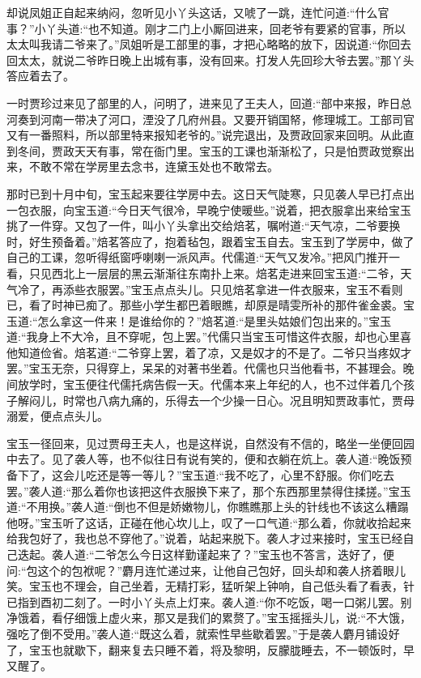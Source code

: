 

\begin{parag}
    却说凤姐正自起来纳闷，忽听见小丫头这话，又唬了一跳，连忙问道:“什么官事？”小丫头道:“也不知道。刚才二门上小厮回进来，回老爷有要紧的官事，所以太太叫我请二爷来了。”凤姐听是工部里的事，才把心略略的放下，因说道:“你回去回太太，就说二爷昨日晚上出城有事，没有回来。打发人先回珍大爷去罢。”那丫头答应着去了。
\end{parag}


\begin{parag}
    一时贾珍过来见了部里的人，问明了，进来见了王夫人，回道:“部中来报，昨日总河奏到河南一带决了河口，湮没了几府州县。又要开销国帑，修理城工。工部司官又有一番照料，所以部里特来报知老爷的。”说完退出，及贾政回家来回明。从此直到冬间，贾政天天有事，常在衙门里。宝玉的工课也渐渐松了，只是怕贾政觉察出来，不敢不常在学房里去念书，连黛玉处也不敢常去。
\end{parag}


\begin{parag}
    那时已到十月中旬，宝玉起来要往学房中去。这日天气陡寒，只见袭人早已打点出一包衣服，向宝玉道:“今日天气很冷，早晚宁使暖些。”说着，把衣服拿出来给宝玉挑了一件穿。又包了一件，叫小丫头拿出交给焙茗，嘱咐道:“天气凉，二爷要换时，好生预备着。”焙茗答应了，抱着毡包，跟着宝玉自去。宝玉到了学房中，做了自己的工课，忽听得纸窗呼喇喇一派风声。代儒道:“天气又发冷。”把风门推开一看，只见西北上一层层的黑云渐渐往东南扑上来。焙茗走进来回宝玉道:“二爷，天气冷了，再添些衣服罢。”宝玉点点头儿。只见焙茗拿进一件衣服来，宝玉不看则已，看了时神已痴了。那些小学生都巴着眼瞧，却原是晴雯所补的那件雀金裘。宝玉道:“怎么拿这一件来！是谁给你的？”焙茗道:“是里头姑娘们包出来的。”宝玉道:“我身上不大冷，且不穿呢，包上罢。”代儒只当宝玉可惜这件衣服，却也心里喜他知道俭省。焙茗道:“二爷穿上罢，着了凉，又是奴才的不是了。二爷只当疼奴才罢。”宝玉无奈，只得穿上，呆呆的对著书坐着。代儒也只当他看书，不甚理会。晚间放学时，宝玉便往代儒托病告假一天。代儒本来上年纪的人，也不过伴着几个孩子解闷儿，时常也八病九痛的，乐得去一个少操一日心。况且明知贾政事忙，贾母溺爱，便点点头儿。
\end{parag}


\begin{parag}
    宝玉一径回来，见过贾母王夫人，也是这样说，自然没有不信的，略坐一坐便回园中去了。见了袭人等，也不似往日有说有笑的，便和衣躺在炕上。袭人道:“晚饭预备下了，这会儿吃还是等一等儿？”宝玉道:“我不吃了，心里不舒服。你们吃去罢。”袭人道:“那么着你也该把这件衣服换下来了，那个东西那里禁得住揉搓。”宝玉道:“不用换。”袭人道:“倒也不但是娇嫩物儿，你瞧瞧那上头的针线也不该这么糟蹋他呀。”宝玉听了这话，正碰在他心坎儿上，叹了一口气道:“那么着，你就收拾起来给我包好了，我也总不穿他了。”说着，站起来脱下。袭人才过来接时，宝玉已经自己迭起。袭人道:“二爷怎么今日这样勤谨起来了？”宝玉也不答言，迭好了，便问:“包这个的包袱呢？”麝月连忙递过来，让他自己包好，回头却和袭人挤着眼儿笑。宝玉也不理会，自己坐着，无精打彩，猛听架上钟响，自己低头看了看表，针已指到酉初二刻了。一时小丫头点上灯来。袭人道:“你不吃饭，喝一口粥儿罢。别净饿着，看仔细饿上虚火来，那又是我们的累赘了。”宝玉摇摇头儿，说:“不大饿，强吃了倒不受用。”袭人道:“既这么着，就索性早些歇着罢。”于是袭人麝月铺设好了，宝玉也就歇下，翻来复去只睡不着，将及黎明，反朦胧睡去，不一顿饭时，早又醒了。
\end{parag}



